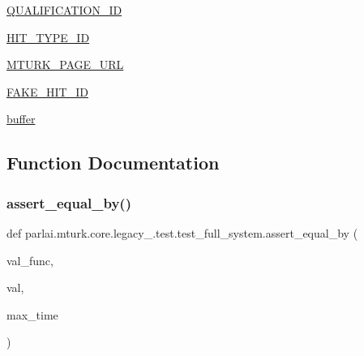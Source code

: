 \begin{DoxyCompactItemize}
\item 
\hyperlink{namespaceparlai_1_1mturk_1_1core_1_1legacy__2018_1_1test_1_1test__full__system_a940287e4716d7569e18aeb7a10f9f97a}{Q\+U\+A\+L\+I\+F\+I\+C\+A\+T\+I\+O\+N\+\_\+\+ID}
\item 
\hyperlink{namespaceparlai_1_1mturk_1_1core_1_1legacy__2018_1_1test_1_1test__full__system_a022e013caf218dddac8f7f9c72b9fd96}{H\+I\+T\+\_\+\+T\+Y\+P\+E\+\_\+\+ID}
\item 
\hyperlink{namespaceparlai_1_1mturk_1_1core_1_1legacy__2018_1_1test_1_1test__full__system_ab0cad83333c31b193a0cfc0dc1197b0d}{M\+T\+U\+R\+K\+\_\+\+P\+A\+G\+E\+\_\+\+U\+RL}
\item 
\hyperlink{namespaceparlai_1_1mturk_1_1core_1_1legacy__2018_1_1test_1_1test__full__system_a2f85d8f9cfd384ff7ab09f6821d76788}{F\+A\+K\+E\+\_\+\+H\+I\+T\+\_\+\+ID}
\item 
\hyperlink{namespaceparlai_1_1mturk_1_1core_1_1legacy__2018_1_1test_1_1test__full__system_a37b9b8b73968dafd1bad016368042618}{buffer}
\end{DoxyCompactItemize}


\subsection{Function Documentation}
\mbox{\label{namespaceparlai_1_1mturk_1_1core_1_1legacy__2018_1_1test_1_1test__full__system_af8faa2b85ee3171cbb14a4ffb6696c91}} 
\subsubsection{\texorpdfstring{assert\+\_\+equal\+\_\+by()}{assert\_equal\_by()}}
{\footnotesize\ttfamily def parlai.\+mturk.\+core.\+legacy\+\_.\+test.\+test\+\_\+full\+\_\+system.\+assert\+\_\+equal\+\_\+by (\begin{DoxyParamCaption}\item[{}]{val\+\_\+func,  }\item[{}]{val,  }\item[{}]{max\+\_\+time }\end{DoxyParamCaption})}



